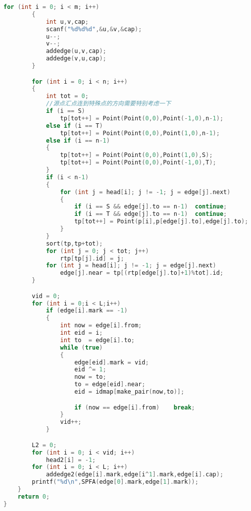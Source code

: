 \begin{lstlisting}[language=c++]
		for (int i = 0; i < m; i++)
		{
			int u,v,cap;
			scanf("%d%d%d",&u,&v,&cap);
			u--;
			v--;
			addedge(u,v,cap);
			addedge(v,u,cap);
		}

		for (int i = 0; i < n; i++)
		{
			int tot = 0;
			//源点汇点连到特殊点的方向需要特别考虑一下
			if (i == S)
				tp[tot++] = Point(Point(0,0),Point(-1,0),n-1);
			else if (i == T)
				tp[tot++] = Point(Point(0,0),Point(1,0),n-1);
			else if (i == n-1)
			{
				tp[tot++] = Point(Point(0,0),Point(1,0),S);
				tp[tot++] = Point(Point(0,0),Point(-1,0),T);
			}
			if (i < n-1)
			{
				for (int j = head[i]; j != -1; j = edge[j].next)
				{
					if (i == S && edge[j].to == n-1)  continue;
					if (i == T && edge[j].to == n-1)  continue;
					tp[tot++] = Point(p[i],p[edge[j].to],edge[j].to);
				}
			}
			sort(tp,tp+tot);
			for (int j = 0; j < tot; j++)
				rtp[tp[j].id] = j;
			for (int j = head[i]; j != -1; j = edge[j].next)
				edge[j].near = tp[(rtp[edge[j].to]+1)%tot].id;
		}

		vid = 0;
		for (int i = 0;i < L;i++)
			if (edge[i].mark == -1)
			{
				int now = edge[i].from;
				int eid = i;
				int to  = edge[i].to;
				while (true)
				{
					edge[eid].mark = vid;
					eid ^= 1;
					now = to;
					to = edge[eid].near;
					eid = idmap[make_pair(now,to)];

					if (now == edge[i].from)	break;
				}
				vid++;
			}

		L2 = 0;
		for (int i = 0; i < vid; i++)
			head2[i] = -1;
		for (int i = 0; i < L; i++)
			addedge2(edge[i].mark,edge[i^1].mark,edge[i].cap);
		printf("%d\n",SPFA(edge[0].mark,edge[1].mark));
	}
	return 0;
}
	\end{lstlisting}